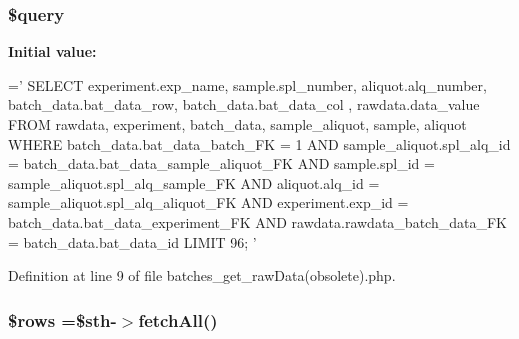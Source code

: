 \hypertarget{batches__get__raw_data_07obsolete_08_8php_af59a5f7cd609e592c41dc3643efd3c98}{
\subsubsection[{\$query}]{\setlength{\rightskip}{0pt plus 5cm}\$query}}\label{batches__get__raw_data_07obsolete_08_8php_af59a5f7cd609e592c41dc3643efd3c98}
{\bfseries Initial value\-:}
\begin{DoxyCode}
=\textcolor{stringliteral}{'}
\textcolor{stringliteral}{    SELECT}
\textcolor{stringliteral}{    experiment.exp\_name, sample.spl\_number, aliquot.alq\_number, batch\_data.bat\_data\_row,
       batch\_data.bat\_data\_col , rawdata.data\_value}
\textcolor{stringliteral}{    FROM }
\textcolor{stringliteral}{    rawdata, experiment, batch\_data, sample\_aliquot, sample, aliquot }
\textcolor{stringliteral}{    WHERE }
\textcolor{stringliteral}{    batch\_data.bat\_data\_batch\_FK = 1 AND}
\textcolor{stringliteral}{    sample\_aliquot.spl\_alq\_id = batch\_data.bat\_data\_sample\_aliquot\_FK AND}
\textcolor{stringliteral}{    sample.spl\_id  = sample\_aliquot.spl\_alq\_sample\_FK AND }
\textcolor{stringliteral}{    aliquot.alq\_id = sample\_aliquot.spl\_alq\_aliquot\_FK AND}
\textcolor{stringliteral}{    experiment.exp\_id = batch\_data.bat\_data\_experiment\_FK AND}
\textcolor{stringliteral}{    rawdata.rawdata\_batch\_data\_FK = batch\_data.bat\_data\_id}
\textcolor{stringliteral}{    LIMIT 96;}
\textcolor{stringliteral}{    '}
\end{DoxyCode}


Definition at line 9 of file batches\-\_\-get\-\_\-raw\-Data(obsolete).\-php.

\hypertarget{batches__get__raw_data_07obsolete_08_8php_ace2ec39e7df3899fa8df9640ec274b03}{
\subsubsection[{\$rows}]{\setlength{\rightskip}{0pt plus 5cm}\$rows =\$sth-\/$>$fetch\-All()}}\label{batches__get__raw_data_07obsolete_08_8php_ace2ec39e7df3899fa8df9640ec274b03}


